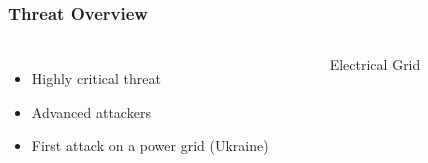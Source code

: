 \begin{frame}
\frametitle{Threat Overview}

\begin{columns}
\begin{itemize}
    \item Highly critical threat
    \item Advanced attackers
    \item First attack on a power grid (Ukraine)
\end{itemize}

\begin{figure}[b]
\caption{Electrical Grid}
\end{figure}
\end{columns}
\end{frame}
